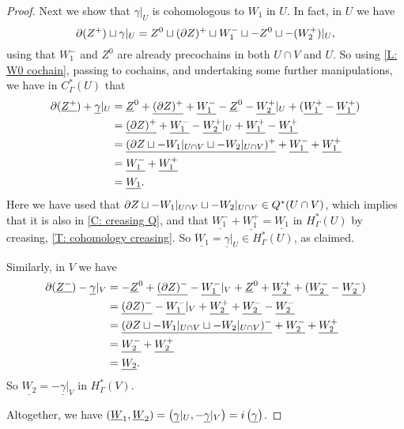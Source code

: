 \begin{proof}
	Next we show that $\gamma|_U$ is cohomologous to $W_1$ in $U$.
	In fact, in $U$ we have
	\[\partial (Z^+) \sqcup \gamma|_U = Z^0 \sqcup (\partial Z)^+ \sqcup W_1^- \sqcup -Z^0 \sqcup -(W_2^+)|_U,\]
	using that $W_1^-$ and $Z^0$ are already precochains in both $U \cap V$ and $U$.
	So using \cref{L: W0 cochain}, passing to cochains, and undertaking some further manipulations, we have in $C^*_\Gamma(U)$ that
	\begin{align*}
	\partial (\underline{Z^+}) + \underline{\gamma}|_U &
		= \underline Z^0 + \underline{(\partial Z)^+} + \underline{W_1^-} - \underline Z^0 -\underline{W_2^+}|_U + (\underline{W_1^+} - \underline{W_1^+})\\
		&= \underline{(\partial Z)^+} + \underline{W_1^-} -\underline{W_2^+}|_U + \underline{W_1^+} - \underline{W_1^+}\\
		&= \underline{(\partial Z \sqcup - W_1|_{U \cap V} \sqcup - W_2|_{U \cap V})^+} + \underline{W_1^-} + \underline{W_1^+}\\
		&=\underline{W_1^-} + \underline{W_1^+}\\
		&=\underline{W_1}.
	\end{align*}
	Here we have used that $\partial Z \sqcup - W_1|_{U \cap V} \sqcup - W_2|_{U \cap V} \in Q^*(U \cap V)$, which implies that it is also in \cref{C: creasing Q},
	and that $\underline{W_1^-} + \underline{W_1^+}= \underline{W_1}$ in $H^*_\Gamma(U)$ by creasing, \cref{T: cohomology creasing}.
	So $\underline{W_1} = \underline{\gamma}|_U \in H^*_\Gamma(U)$, as claimed.

	Similarly, in $V$ we have
	\begin{align*}
	\partial (\underline{Z^-}) - \underline{\gamma}|_V &
		= - \underline Z^0 + \underline{(\partial Z)^-} - \underline{W_1^-}|_V + \underline Z^0 +\underline{W_2^+} + (\underline{W_2^-} - \underline{W_2^-})\\
		&= \underline{(\partial Z)^-} - \underline{W_1^-}|_V + \underline{W_2^+} + \underline{W_2^-} - \underline{W_2^-}\\
		&= \underline{(\partial Z \sqcup - W_1|_{U \cap V} \sqcup - W_2|_{U \cap V})^-} + \underline{W_2^-} + \underline{W_2^+}\\
		&=\underline{W_2^-} + \underline{W_2^+}\\
		&=\underline{W_2}.
	\end{align*}
	So $\underline{W_2} = -\underline{\gamma}|_V$ in $H^*_\Gamma(V)$.


	Altogether, we have $(\underline{W}_1,\underline{W}_2) = \left(\underline{\gamma}|_U, -\underline{\gamma}|_V\right) = i\left(\underline{\gamma}\right)$.


\end{proof}
